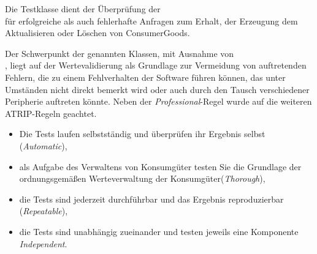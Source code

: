 Die Testklasse \href{https://github.com/lucasmerkel/dhbw-advancedswe-programmentwurf/blob/5764d7da4cfd0562ed8e96128e92f85c30b7309d/swe_programmentwurf/consumergoods-inventory-planner/0-cip-plugins/src/test/java/de/dhbw/cip/ConsumerGoodsGuiControllerTest.java}{} dient der Überprüfung der \\\href{https://github.com/lucasmerkel/dhbw-advancedswe-programmentwurf/blob/5764d7da4cfd0562ed8e96128e92f85c30b7309d/swe_programmentwurf/consumergoods-inventory-planner/0-cip-plugins/src/test/java/de/dhbw/cip/ConsumerGoodsGuiControllerTest.java#L56}{} für erfolgreiche als auch fehlerhafte Anfragen zum Erhalt, der Erzeugung dem Aktualisieren oder Löschen von ConsumerGoods.

Der Schwerpunkt der genannten Klassen, mit Ausnahme von \\\href{https://github.com/lucasmerkel/dhbw-advancedswe-programmentwurf/blob/5764d7da4cfd0562ed8e96128e92f85c30b7309d/swe_programmentwurf/consumergoods-inventory-planner/0-cip-plugins/src/test/java/de/dhbw/cip/ConsumerGoodsGuiControllerTest.java}{}, liegt auf der Wertevalidierung als Grundlage zur Vermeidung von auftretenden Fehlern, die zu einem Fehlverhalten der Software führen können, das unter Umständen nicht direkt bemerkt wird oder auch durch den Tausch verschiedener Peripherie auftreten könnte.
Neben der \textit{Professional}-Regel wurde auf die weiteren ATRIP-Regeln geachtet.
\begin{itemize}
    \item Die Tests laufen selbstständig und überprüfen ihr Ergebnis selbst (\textit{Automatic}),
    \item als Aufgabe des Verwaltens von Konsumgüter testen Sie die Grundlage der ordnungsgemäßen Werteverwaltung der Konsumgüter(\textit{Thorough}),
    \item die Tests sind jederzeit durchführbar und das Ergebnis reproduzierbar (\textit{Repeatable}),
    \item die Tests sind unabhängig zueinander und testen jeweils eine Komponente \textit{Independent}.
\end{itemize}

